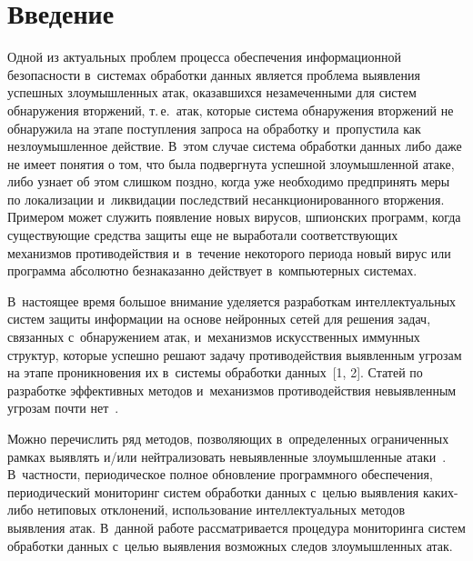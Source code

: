 
  



\thispagestyle{headings}

\begin{multicols}{2}

\label{st\stat}

  \section{Введение}
  
  Одной из актуальных проблем процесса обеспечения информационной 
безопасности в~системах обработки данных является проблема выявления 
успешных злоумышленных атак, оказавшихся незамеченными для систем 
обнаружения вторжений, т.\,е.\ атак, которые система обнаружения 
вторжений не обнаружила на этапе поступления запроса на обработку 
и~пропустила как незлоумышленное действие. В~этом случае система 
обработки данных либо даже не имеет понятия о том, что была подвергнута 
успешной злоумышленной атаке, либо узнает об этом слишком поздно, когда 
уже необходимо предпринять меры по локализации и~ликвидации последствий 
несанкционированного вторжения. Примером может служить появление новых 
вирусов, шпионских программ, когда су\-щест\-ву\-ющие средства защиты еще не 
выработали соответствующих механизмов противодействия и~в~течение 
некоторого периода новый вирус или программа абсолютно безнаказанно 
действует в~компьютерных системах. 
  
  В~настоящее время большое внимание уделяется разработкам 
интеллектуальных систем защиты информации на основе нейронных сетей для 
решения задач, связанных с~обнаружением атак, и~механизмов искусственных 
иммунных структур, которые успешно решают задачу противодействия 
выявленным угрозам на этапе проникновения их в~системы обработки 
данных~[1, 2]. Статей по разработке эффективных методов и~механизмов 
противодействия невыявленным угрозам почти нет~\cite{2-sim}.
  
  Можно перечислить ряд методов, позволяющих в~определенных 
ограниченных рамках выявлять и/или нейтрализовать невыявленные 
злоумышленные атаки~\cite{2-sim}. В~част\-ности, периодическое полное 
обновление программного обеспечения, периодический мониторинг систем 
обработки данных с~целью выявления ка\-ких-ли\-бо нетиповых отклонений, 
использование интеллектуальных методов выявления атак. В~данной работе 
рассматривается процедура мониторинга систем обработки данных с~\mbox{целью} 
выявления возможных следов злоумышленных атак.
  

\end{multicols}
